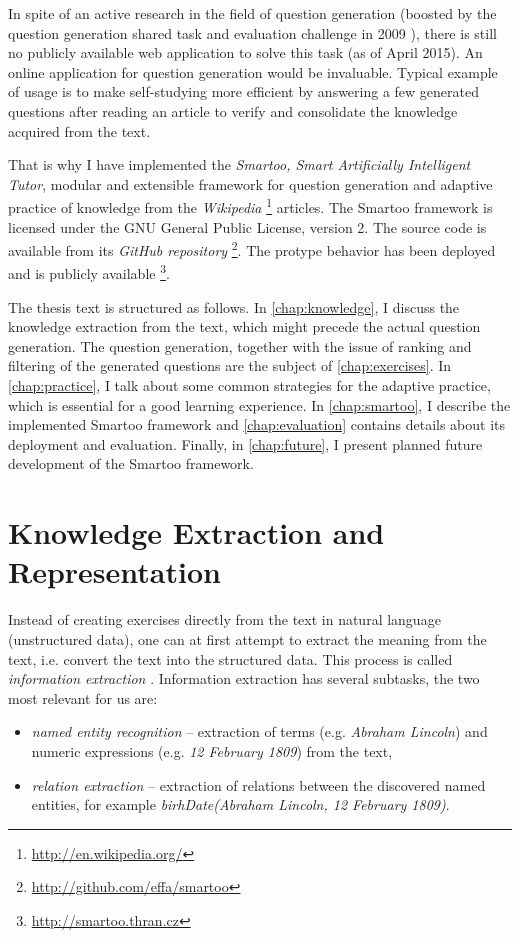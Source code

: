 \documentclass[12pt, twoside]{fithesis2}		%
\renewcommand{\_}{\leavevmode \kern0.07em\vbox{\hrule width0.4em}}
\newcommand{\squarebullet}{\textcolor{black}{\raisebox{0.15em}{\rule{4pt}{4pt}}}}
\newcommand{\emptysquarebullet}{\textcolor{black}{\raisebox{0.10em}{\tiny$\square$}}}
\newenvironment{myItemize}{
  \begin{itemize}[leftmargin=2em,rightmargin=1em,itemsep=\parskip ,parsep=0em,topsep=0em,partopsep=0em]
  \renewcommand{\labelitemi}{\squarebullet}
  \renewcommand{\labelitemii}{\textbullet}
}{
  \end{itemize}
}
\begin{document}
In spite of an active research in the field of question generation
(boosted by the question generation shared task and evaluation challenge in 2009 \cite{shared-task2009}),
there is still no publicly available web application to solve this task (as of April 2015).
An online application for question generation would be invaluable.
Typical example of usage is to make self-studying more efficient by answering a few generated questions after reading an article to verify and consolidate the knowledge acquired from the text.

That is why I have implemented the \textit{Smartoo, Smart Artificially Intelligent Tutor}, modular and extensible framework for question generation and adaptive practice
of knowledge from the \emph{Wikipedia}%
\footnote{\url{http://en.wikipedia.org/}}
articles.
The Smartoo framework is licensed under the GNU General Public License, version 2.
The source code is available from its \textit{GitHub repository}%
\footnote{\url{http://github.com/effa/smartoo}}.
The protype behavior has been deployed and is publicly available%
\footnote{\url{http://smartoo.thran.cz}}.

The thesis text is structured as follows.
In \autoref{chap:knowledge}, I discuss the knowledge extraction from the text,
which might precede the actual question generation.
The question generation, together with the issue of ranking and filtering of the generated questions are the subject of \autoref{chap:exercises}.
In \autoref{chap:practice}, I talk about some common strategies for the adaptive practice, which is essential for a good learning experience.
In \autoref{chap:smartoo}, I describe the implemented Smartoo framework
and \autoref{chap:evaluation} contains details about its deployment and evaluation.
Finally, in \autoref{chap:future}, I present planned future development of the Smartoo framework.




\chapter{Knowledge Extraction and Representation}
\label{chap:knowledge}

Instead of creating exercises directly from the text in natural language (unstructured data),
one can at first attempt to extract the meaning from the text,
i.e. convert the text into the structured data.
This process is called \textit{information extraction} \cite[][262]{nlp-python}.
Information extraction has several subtasks, the two most relevant for us are:
\begin{myItemize}
  \item \textit{named entity recognition} -- extraction of terms (e.g. \textit{Abraham Lincoln}) and numeric expressions (e.g. \emph{12 February 1809}) from the text,
  \item \textit{relation extraction} -- extraction of relations between the discovered named entities,
    for example \emph{birhDate(Abraham Lincoln, 12 February 1809)}.
\end{myItemize}
\end{document}
